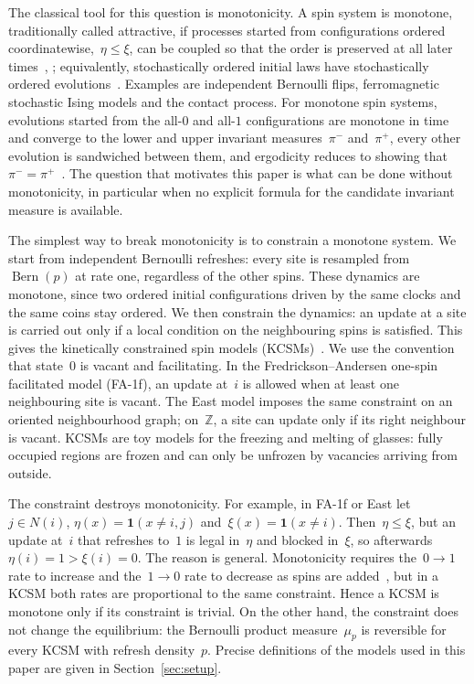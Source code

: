 \documentclass[EJP,preprint,NODS,nobera]{ejpecp}
\newcommand{\Z}{\mathbb{Z}}
\newcommand{\ind}{\mathbf{1}}
\begin{document}
The classical tool for this question is monotonicity. A spin system is
monotone, traditionally called attractive, if processes started from
configurations ordered coordinatewise,~$\eta\leq\xi$, can be coupled so that
the order is preserved at all later times~\cite{Harris1977},
\cite[Chapter~III, Theorem~2.2]{Liggett1985}; equivalently, stochastically
ordered initial laws have stochastically ordered
evolutions~\cite[Chapter~II, Theorem~2.2 and Definition~2.3]{Liggett1985}.
Examples are independent Bernoulli flips, ferromagnetic stochastic Ising
models and the contact process. For monotone spin systems, evolutions started
from the all-$0$ and all-$1$ configurations are monotone in time and converge
to the lower and upper invariant measures~$\pi^-$ and~$\pi^+$, every other
evolution is sandwiched between them, and ergodicity reduces to showing
that~$\pi^-=\pi^+$~\cite[Chapter~III, Theorem~2.3 and
Corollary~2.4]{Liggett1985}. The question that motivates this paper is what
can be done without monotonicity, in particular when no explicit formula for
the candidate invariant measure is available.

The simplest way to break monotonicity is to constrain a monotone system. We
start from independent Bernoulli refreshes: every site is resampled
from~$\operatorname{Bern}(p)$ at rate one, regardless of the other spins.
These dynamics are monotone, since two ordered initial configurations driven
by the same clocks and the same coins stay ordered. We then constrain the
dynamics: an update at a site is carried out only if a local condition on the
neighbouring spins is satisfied. This gives the kinetically constrained spin
models (KCSMs)~\cite{FredricksonAndersen1984,CancriniEtAl2008,HartarskyToninelli2025}.
We use the convention that state~$0$ is vacant and facilitating. In the
Fredrickson--Andersen one-spin facilitated model (FA-1f), an update at~$i$ is
allowed when at least one neighbouring site is vacant. The East model imposes
the same constraint on an oriented neighbourhood graph; on~$\Z$, a site can
update only if its right neighbour is vacant. KCSMs are toy models for the
freezing and melting of glasses: fully occupied regions are frozen and can
only be unfrozen by vacancies arriving from outside.

The constraint destroys monotonicity. For example, in FA-1f or East
let~$j\in N(i)$, $\eta(x)=\ind(x\neq i,j)$ and~$\xi(x)=\ind(x\neq i)$.
Then~$\eta\leq\xi$, but an update at~$i$ that refreshes to~$1$ is legal
in~$\eta$ and blocked in~$\xi$, so afterwards~$\eta(i)=1>\xi(i)=0$. The
reason is general. Monotonicity requires the~$0\to1$ rate to increase and
the~$1\to0$ rate to decrease as spins are added~\cite[Chapter~III,
Definition~2.1 and Theorem~2.2]{Liggett1985}, but in a KCSM both rates are
proportional to the same constraint. Hence a KCSM is monotone only if its
constraint is trivial. On the other hand, the constraint does not change the
equilibrium: the Bernoulli product measure~$\mu_p$ is reversible for every
KCSM with refresh density~$p$. Precise definitions of the models used in this
paper are given in Section~\ref{sec:setup}.
\end{document}
